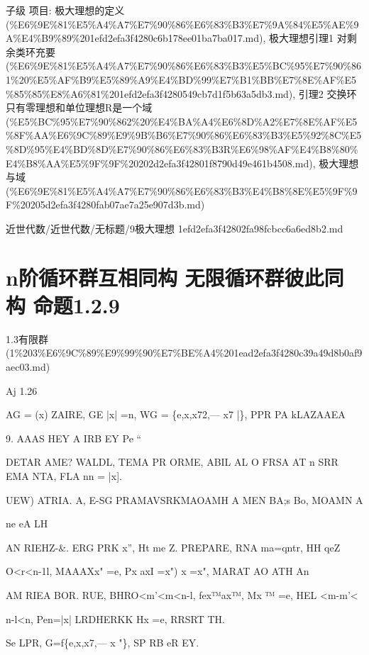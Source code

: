 \begin{note}[9极大理想]

子级 项目: 极大理想的定义 (\%E6\%9E\%81\%E5\%A4\%A7\%E7\%90\%86\%E6\%83\%B3\%E7\%9A\%84\%E5\%AE\%9A\%E4\%B9\%89\%201efd2efa3f4280c6b178ee01ba7ba017.md), 极大理想引理1 对剩余类环充要 (\%E6\%9E\%81\%E5\%A4\%A7\%E7\%90\%86\%E6\%83\%B3\%E5\%BC\%95\%E7\%90\%861\%20\%E5\%AF\%B9\%E5\%89\%A9\%E4\%BD\%99\%E7\%B1\%BB\%E7\%8E\%AF\%E5\%85\%85\%E8\%A6\%81\%201efd2efa3f4280549cb7d1f5b63a5db3.md), 引理2 交换环只有零理想和单位理想R是一个域 (\%E5\%BC\%95\%E7\%90\%862\%20\%E4\%BA\%A4\%E6\%8D\%A2\%E7\%8E\%AF\%E5\%8F\%AA\%E6\%9C\%89\%E9\%9B\%B6\%E7\%90\%86\%E6\%83\%B3\%E5\%92\%8C\%E5\%8D\%95\%E4\%BD\%8D\%E7\%90\%86\%E6\%83\%B3R\%E6\%98\%AF\%E4\%B8\%80\%E4\%B8\%AA\%E5\%9F\%9F\%20202d2efa3f42801f8790d49e461b4508.md), 极大理想与域 (\%E6\%9E\%81\%E5\%A4\%A7\%E7\%90\%86\%E6\%83\%B3\%E4\%B8\%8E\%E5\%9F\%9F\%20205d2efa3f4280fab07ae7a25e907d3b.md)

\end{note}

\begin{note}[来源路径]

近世代数/近世代数/无标题/9极大理想 1efd2efa3f42802fa98fcbcc6a6ed8b2.md

\end{note}

\section*{n阶循环群互相同构 无限循环群彼此同构 命题1.2.9}

\begin{note}[来源上级主题]

1.3有限群 (1\%203\%E6\%9C\%89\%E9\%99\%90\%E7\%BE\%A4\%201ead2efa3f4280c39a49d8b0af9aec03.md)

\end{note}

\begin{proposition}

Aj 1.26

AG = (x) ZAIRE, GE |x| =n, WG = \{e,x,x72,--- x7 |\}, PPR PA kLAZAAEA

9. AAAS HEY A IRB EY Pe                            “

DETAR AME? WALDL, TEMA PR ORME, ABIL AL O FRSA AT n SRR EMA NTA, FLA nn = |x].

UEW) ATRIA. A, E-SG PRAMAVSRKMAOAMH A MEN BA;s Bo, MOAMN A

ne eA LH

AN RIEHZ-\&. ERG PRK x”, Ht me Z. PREPARE, RNA ma=qntr, HH qeZ

O<r<n-1l, MAAAXx" =e, Px axI =x") x =x", MARAT AO ATH An

AM RIEA BOR. RUE, BHRO<m'<m<n-l, fex™ax™, Mx ™ =e, HEL <m-m'<

n-l<n, Pen=|x| LRDHERKK Hx =e, RRSRT TH.

Se LPR, G=f\{e,x,x7,--- x "\}, SP RB eR EY.

\end{proposition}

